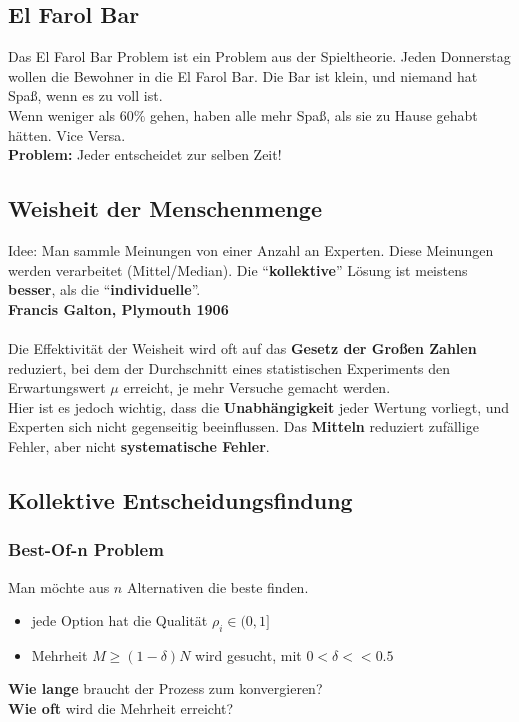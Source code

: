 \documentclass[a4paper]{article}
\begin{document}
\subsection{El Farol Bar}
Das El Farol Bar Problem ist ein Problem aus der Spieltheorie. Jeden Donnerstag wollen die Bewohner in die El Farol Bar. Die Bar ist klein, und niemand hat Spaß, wenn es zu voll ist.\\
Wenn weniger als $60\%$ gehen, haben alle mehr Spaß, als sie zu Hause gehabt hätten. Vice Versa.\\
\textbf{Problem:} Jeder entscheidet zur selben Zeit!
\subsection{Weisheit der Menschenmenge}
Idee: Man sammle Meinungen von einer Anzahl an Experten. Diese Meinungen werden verarbeitet (Mittel/Median). Die ``\textbf{kollektive}'' Lösung ist meistens \textbf{besser}, als die ``\textbf{individuelle}''.\\
\textbf{Francis Galton, Plymouth 1906}\\
\\
Die Effektivität der Weisheit wird oft auf das \textbf{Gesetz der Großen Zahlen} reduziert, bei dem der Durchschnitt eines statistischen Experiments den Erwartungswert $\mu$ erreicht, je mehr Versuche gemacht werden.\\
Hier ist es jedoch wichtig, dass die \textbf{Unabhängigkeit} jeder Wertung vorliegt, und Experten sich nicht gegenseitig beeinflussen. Das \textbf{Mitteln} reduziert zufällige Fehler, aber nicht \textbf{systematische Fehler}. 
\subsection{Kollektive Entscheidungsfindung}
\subsubsection{Best-Of-n Problem}
Man möchte aus $n$ Alternativen die beste finden.
\begin{itemize}
	\item jede Option hat die Qualität $\rho_i\in (0,1]$
	\item Mehrheit $M\geq (1-\delta)N$ wird gesucht, mit $0<\delta<<0.5$
\end{itemize}
\textbf{Wie lange} braucht der Prozess zum konvergieren?\\
\textbf{Wie oft} wird die Mehrheit erreicht?
\end{document}
